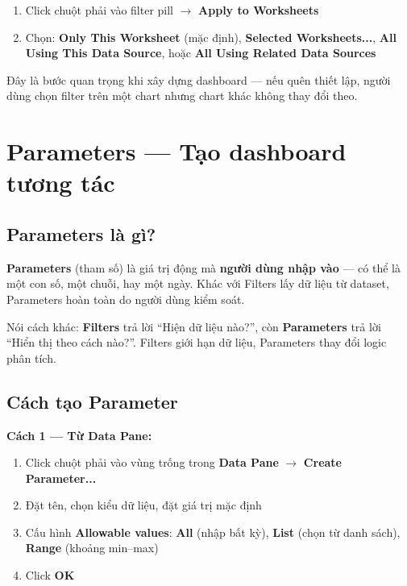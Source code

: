 \documentclass[12pt]{article}
\begin{document}
\begin{enumerate}[nosep]
    \item Click chuột phải vào filter pill $\rightarrow$ \textbf{Apply to Worksheets}
    \item Chọn: \textbf{Only This Worksheet} (mặc định), \textbf{Selected Worksheets...}, \textbf{All Using This Data Source}, hoặc \textbf{All Using Related Data Sources}
\end{enumerate}

\noindent Đây là bước quan trọng khi xây dựng dashboard --- nếu quên thiết lập, người dùng chọn filter trên một chart nhưng chart khác không thay đổi theo.



\newpage
\section{Parameters --- Tạo dashboard tương tác}
\label{section:parameters}

\subsection{Parameters là gì?}

\noindent \textbf{Parameters} (tham số) là giá trị động mà \textbf{người dùng nhập vào} --- có thể là một con số, một chuỗi, hay một ngày. Khác với Filters lấy dữ liệu từ dataset, Parameters hoàn toàn do người dùng kiểm soát.

\noindent Nói cách khác: \textbf{Filters} trả lời ``Hiện dữ liệu nào?'', còn \textbf{Parameters} trả lời ``Hiển thị theo cách nào?''. Filters giới hạn dữ liệu, Parameters thay đổi logic phân tích.

\subsection{Cách tạo Parameter}

\noindent \textbf{Cách 1 --- Từ Data Pane:}

\begin{enumerate}[nosep]
    \item Click chuột phải vào vùng trống trong \textbf{Data Pane} $\rightarrow$ \textbf{Create Parameter...}
    \item Đặt tên, chọn kiểu dữ liệu, đặt giá trị mặc định
    \item Cấu hình \textbf{Allowable values}: \textbf{All} (nhập bất kỳ), \textbf{List} (chọn từ danh sách), \textbf{Range} (khoảng min--max)
    \item Click \textbf{OK}
\end{enumerate}
\end{document}
